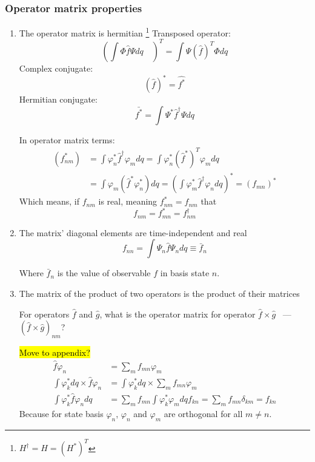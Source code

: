 			\subsubsection{Operator matrix properties}
				\begin{enumerate}
					\item The operator matrix is hermitian \footnote{$H^\dag = H = (H^*)^T$}
						Transposed operator:
						\begin{equation}
							(\int \Phi \hat{f} \Psi dq \quad)^T = \int \Psi (\hat{f})^T \Phi dq
						\end{equation}
						Complex conjugate:
						\begin{equation}
							(\hat{f})^* = \hat{f^*}
						\end{equation}	
						Hermitian conjugate:
						\begin{equation}
							\bar{f^*} = \int \Psi^* \hat{f}^\dag \Psi dq
						\end{equation}
						
						In operator matrix terms:
						\begin{align}
							(f_{nm}^*) &= \int \varphi_n^* \hat{f}^\dag \varphi_m dq = \int \varphi_n^* (\hat{f}^*)^T \varphi_m dq \nonumber \\
							&= \int \varphi_m (\hat{f}^* \varphi_n^*) dq = (\int \varphi_m^* \hat{f}^\dag \varphi_n dq )^* = (f_{mn})^*
						\end{align}
						Which means, if $f_{nm}$ is real, meaning $f_{nm}^* = f_{nm}$ that
						\begin{equation}
							f_{nm} = f_{mn}^* = f_{nm}^\dag
						\end{equation}
					\item The matrix' diagonal elements are time-independent and real
						\begin{equation}
							f_{nn} = \int \Psi_n \hat{f} \Psi_n dq \equiv \bar{f}_{n}
						\end{equation}
						
						Where $\bar{f}_{n}$ is the value of observable $f$ in basis state $n$.
						
					\item The matrix of the product of two operators is the product of their matrices
					
						For operators $\hat{f}$ and $\hat{g}$, what is the operator matrix for operator $\hat{f}\times\hat{g}$ ~--- $(\hat{f}\times\hat{g})_{nm}$?

						\hl{Move to appendix?}						
						\begin{align}
							\hat{f}\varphi_n &= \sum_m f_{mn} \varphi_m \\
							\int \varphi_k^* dq \times \hat{f}\varphi_n &=  \int \varphi_k^* dq \times \sum_m f_{mn} \varphi_m \nonumber \\
							\int \varphi_k^* \hat{f}\varphi_n dq &= \sum_m f_{mn} \int \varphi_k^* \varphi_m dq
							f_{kn} = \sum_m f_{mn} \delta_{km} = f_{kn}
						\end{align}
						Because for state basis ${\varphi_n}$, $\varphi_n$ and $\varphi_m$ are orthogonal for all $m \not= n$.
						

\end{enumerate}
